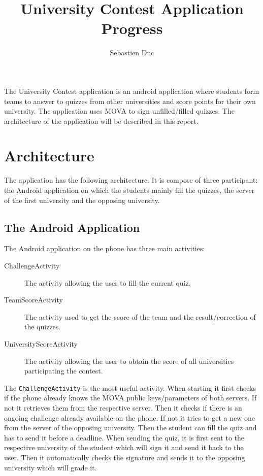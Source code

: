 \documentclass[12pt,4paper]{article}
\title{University Contest Application Progress}
\author{Sebastien Duc}
\date{}
\begin{document}
    \maketitle

    The University Contest application is an android application where students form teams to answer to quizzes from other universities and score points for their own university.
    The application uses MOVA to sign unfilled/filled quizzes.
    The architecture of the application will be described in this report.

    \section{Architecture}
    The application has the following architecture. It is compose of three participant: 
    the Android application on which the students mainly fill the quizzes, the server of the first university and the opposing university.
    
    \subsection{The Android Application}
    The Android application on the phone has three main activities:
    \begin{description}
        \item[ChallengeActivity] The activity allowing the user to fill the current quiz.
        \item[TeamScoreActivity] The activity used to get the score of the team and the result/correction of the quizzes.
        \item[UniversityScoreActivity] The activity allowing the user to obtain the score of all universities participating the contest.
    \end{description}
    The \texttt{ChallengeActivity} is the most useful activity. When starting it first checks if the phone already knows the MOVA public keys/parameters of both servers. If not it 
    retrieves them from the respective server. Then it checks if there is an ongoing challenge already available on the phone. If not it tries to get a new one from the server of 
    the opposing university. Then the student can fill the quiz and has to send it before a deadline. When sending the quiz, it is first sent to the respective university of the student 
    which will sign it and send it back to the user. Then it automatically checks the signature and sends it to the opposing university which will grade it.
\end{document}
